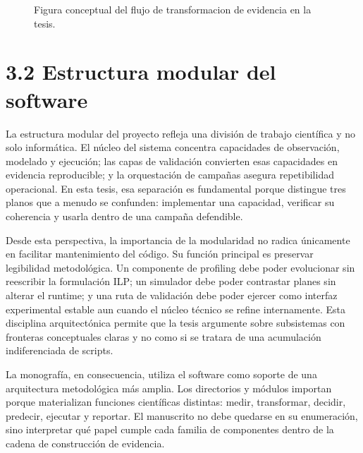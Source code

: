 \begin{figure}[t]
\centering
{}
\caption{Figura conceptual del flujo de transformacion de evidencia en la tesis.}
\label{fig:conceptual-pipeline}
\end{figure}

\section{3.2 Estructura modular del software}
La estructura modular del proyecto refleja una división de trabajo científica y no solo informática. El núcleo del sistema concentra capacidades de observación, modelado y ejecución; las capas de validación convierten esas capacidades en evidencia reproducible; y la orquestación de campañas asegura repetibilidad operacional. En esta tesis, esa separación es fundamental porque distingue tres planos que a menudo se confunden: implementar una capacidad, verificar su coherencia y usarla dentro de una campaña defendible.

Desde esta perspectiva, la importancia de la modularidad no radica únicamente en facilitar mantenimiento del código. Su función principal es preservar legibilidad metodológica. Un componente de profiling debe poder evolucionar sin reescribir la formulación ILP; un simulador debe poder contrastar planes sin alterar el runtime; y una ruta de validación debe poder ejercer como interfaz experimental estable aun cuando el núcleo técnico se refine internamente. Esta disciplina arquitectónica permite que la tesis argumente sobre subsistemas con fronteras conceptuales claras y no como si se tratara de una acumulación indiferenciada de scripts.

La monografía, en consecuencia, utiliza el software como soporte de una arquitectura metodológica más amplia. Los directorios y módulos importan porque materializan funciones científicas distintas: medir, transformar, decidir, predecir, ejecutar y reportar. El manuscrito no debe quedarse en su enumeración, sino interpretar qué papel cumple cada familia de componentes dentro de la cadena de construcción de evidencia.

